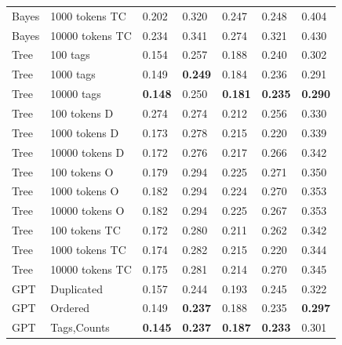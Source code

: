 \documentclass[sn-mathphys]{sn-jnl}%
\theoremstyle{thmstyleone}%
\theoremstyle{thmstyletwo}%
\theoremstyle{thmstylethree}%
\begin{document}
\begin{table}[h!]
\begin{center}
\begin{minipage}{\textwidth}
\begin{tabular}{@{}lllllll@{}}
      Bayes     & 1000 tokens TC                      & 0.202            & 0.320           & 0.247          & 0.248           & 0.404          \\
      Bayes     & 10000 tokens TC                     & 0.234            & 0.341           & 0.274          & 0.321           & 0.430          \\
      \midrule
      Tree      & 100 tags                            & 0.154            & 0.257           & 0.188          & 0.240           & 0.302          \\
      Tree      & 1000 tags                           & 0.149            &\textbf{0.249}   & 0.184          & 0.236           & 0.291          \\
      Tree      & 10000 tags                          &\textbf{0.148}    & 0.250           &\textbf{0.181}  &\textbf{0.235}   &\textbf{0.290}  \\
      Tree      & 100 tokens D                        & 0.274            & 0.274           & 0.212          & 0.256           & 0.330          \\
      Tree      & 1000 tokens D                       & 0.173            & 0.278           & 0.215          & 0.220           & 0.339          \\
      Tree      & 10000 tokens D                      & 0.172            & 0.276           & 0.217          & 0.266           & 0.342          \\
      Tree      & 100 tokens O                        & 0.179            & 0.294           & 0.225          & 0.271           & 0.350          \\
      Tree      & 1000 tokens O                       & 0.182            & 0.294           & 0.224          & 0.270           & 0.353          \\
      Tree      & 10000 tokens O                      & 0.182            & 0.294           & 0.225          & 0.267           & 0.353          \\
      Tree      & 100 tokens TC                       & 0.172            & 0.280           & 0.211          & 0.262           & 0.342          \\
      Tree      & 1000 tokens TC                      & 0.174            & 0.282           & 0.215          & 0.220           & 0.344          \\
      Tree      & 10000 tokens TC                     & 0.175            & 0.281           & 0.214          & 0.270           & 0.345          \\
      \midrule
      GPT       & Duplicated\footnotemark[5]          & 0.157            & 0.244           & 0.193          & 0.245           & 0.322          \\
      GPT       & Ordered\footnotemark[6]             & 0.149            & \textbf{0.237}  & 0.188          & 0.235           & \textbf{0.297}          \\
      GPT       & Tags,Counts\footnotemark[7]         & \textbf{0.145}   & \textbf{0.237}  & \textbf{0.187} & \textbf{0.233}  & 0.301          \\


\end{tabular}
\end{minipage}
\end{center}
\end{table}
\end{document}
